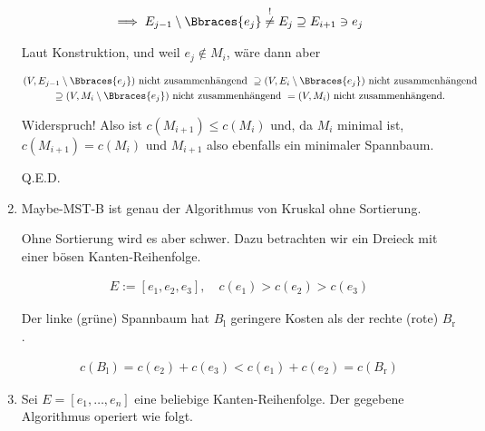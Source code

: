 \begin{solution}
\begin{enumerate}[label = (\Alph*)]
    \begin{align*}
        \implies
        E_{j-1} \setminus \Bbraces{e_j}
        \stackrel{!}{\neq}
        E_j
        \supseteq
        E_{i+1}
        \ni
        e_j
    \end{align*}

    Laut Konstruktion, und weil $e_j \not \in M_i$, wäre dann aber

    \begin{multline*}
        (V, E_{j-1} \setminus \Bbraces{e_j}) ~\text{nicht zusammenhängend}~
        \supseteq
        (V, E_i     \setminus \Bbraces{e_j}) ~\text{nicht zusammenhängend} \\
        \supseteq
        (V, M_i     \setminus \Bbraces{e_j}) ~\text{nicht zusammenhängend}~
        =
        (V, M_i)                             ~\text{nicht zusammenhängend.}
    \end{multline*}

    Widerspruch!
    Also ist $c(M_{i+1}) \leq c(M_i)$ und, da $M_i$ minimal ist, $c(M_{i+1}) = c(M_i)$ und $M_{i+1}$ also ebenfalls ein minimaler Spannbaum.

    Q.E.D.

    \item Maybe-MST-B ist genau der Algorithmus von Kruskal ohne Sortierung.


    Ohne Sortierung wird es aber schwer.
    Dazu betrachten wir ein Dreieck mit einer bösen Kanten-Reihenfolge.

    \begin{align*}
        E := [e_1, e_2, e_3],
        \quad
        c(e_1) > c(e_2) > c(e_3)
    \end{align*}

    \begin{center}
        
    \end{center}

    Der linke (grüne) Spannbaum hat $B_\mathrm{l}$ geringere Kosten als der rechte (rote) $B_\mathrm{r}$.

    \begin{align*}
        c(B_\mathrm{l})
        =
        c(e_2) + c(e_3)
        <
        c(e_1) + c(e_2)
        =
        c(B_\mathrm{r})
    \end{align*}

    \item Sei $E = [e_1, \dots, e_n]$ eine beliebige Kanten-Reihenfolge.
    Der gegebene Algorithmus operiert wie folgt.


\end{enumerate}
\end{solution}
